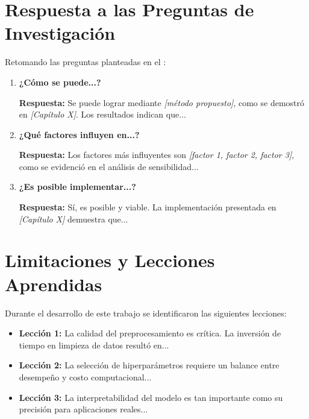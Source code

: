 \section{Respuesta a las Preguntas de Investigación}
\label{sec:respuestas}

Retomando las preguntas planteadas en el :

\begin{enumerate}
    \item \textbf{¿Cómo se puede...?}
    
    \textbf{Respuesta:} Se puede lograr mediante \textit{[método propuesto]}, como se demostró en \textit{[Capítulo X]}. Los resultados indican que...
    
    \item \textbf{¿Qué factores influyen en...?}
    
    \textbf{Respuesta:} Los factores más influyentes son \textit{[factor 1, factor 2, factor 3]}, como se evidenció en el análisis de sensibilidad...
    
    \item \textbf{¿Es posible implementar...?}
    
    \textbf{Respuesta:} Sí, es posible y viable. La implementación presentada en \textit{[Capítulo X]} demuestra que...
\end{enumerate}

\section{Limitaciones y Lecciones Aprendidas}
\label{sec:lecciones}

Durante el desarrollo de este trabajo se identificaron las siguientes lecciones:

\begin{itemize}
    \item \textbf{Lección 1:} La calidad del preprocesamiento es crítica. La inversión de tiempo en limpieza de datos resultó en...
    
    \item \textbf{Lección 2:} La selección de hiperparámetros requiere un balance entre desempeño y costo computacional...
    
    \item \textbf{Lección 3:} La interpretabilidad del modelo es tan importante como su precisión para aplicaciones reales...
\end{itemize}

